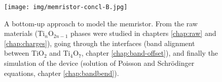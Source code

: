 \begin{center}
  \begin{figure}[h!]
    \begin{center}
      \texttt{[image: img/memristor-concl-B.jpg]}    
      \caption{A bottom-up approach to model the memristor. From the raw materials (Ti$_n$O$_{2n-1}$ phases were studied in chapters \ref{chap:raw} and \ref{chap:charges}), going through the interfaces (band alignment between TiO$_2$ and Ti$_4$O$_7$, chapter \ref{chap:band-offset}), and finally the simulation of the device (solution of Poisson and Schr\"odinger equations, chapter \ref{chap:bandbend}).} 
      \label{fig:mem-concl} 
    \end{center}
  \end{figure}
\end{center}
